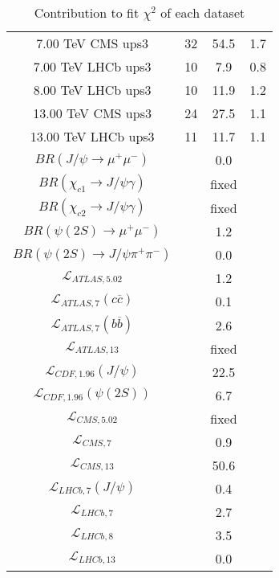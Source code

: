 \begin{table}[h!]
\begin{tabular}{c|c|c|c}
7.00 TeV CMS ups3 & 32 & 54.5 & 1.7 \\
7.00 TeV LHCb ups3 & 10 & 7.9 & 0.8 \\
8.00 TeV LHCb ups3 & 10 & 11.9 & 1.2 \\
13.00 TeV CMS ups3 & 24 & 27.5 & 1.1 \\
13.00 TeV LHCb ups3 & 11 & 11.7 & 1.1 \\
\hline
$BR(J/\psi\rightarrow\mu^+\mu^-)$ &  & 0.0 &  \\
$BR(\chi_{c1}\rightarrow J/\psi\gamma)$ &  & fixed & \\
$BR(\chi_{c2}\rightarrow J/\psi\gamma)$ &  & fixed & \\
$BR(\psi(2S)\rightarrow\mu^+\mu^-)$ &  & 1.2 &  \\
$BR(\psi(2S)\rightarrow J/\psi\pi^+\pi^-)$ &  & 0.0 &  \\
$\mathcal L_{ATLAS,5.02}$ &  & 1.2 &  \\
$\mathcal L_{ATLAS,7}(c\overline c)$ &  & 0.1 &  \\
$\mathcal L_{ATLAS,7}(b\overline b)$ &  & 2.6 &  \\
$\mathcal L_{ATLAS,13}$ &  & fixed & \\
$\mathcal L_{CDF,1.96}(J/\psi)$ &  & 22.5 &  \\
$\mathcal L_{CDF,1.96}(\psi(2S))$ &  & 6.7 &  \\
$\mathcal L_{CMS,5.02}$ &  & fixed & \\
$\mathcal L_{CMS,7}$ &  & 0.9 &  \\
$\mathcal L_{CMS,13}$ &  & 50.6 &  \\
$\mathcal L_{LHCb,7}(J/\psi)$ &  & 0.4 &  \\
$\mathcal L_{LHCb,7}$ &  & 2.7 &  \\
$\mathcal L_{LHCb,8}$ &  & 3.5 &  \\
$\mathcal L_{LHCb,13}$ &  & 0.0 &  \\
\end{tabular}
\caption{Contribution to fit $\chi^2$ of each dataset}
\end{table}
